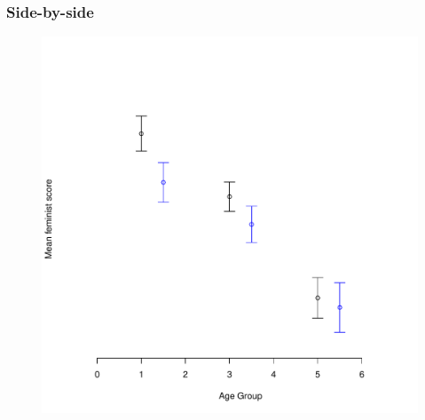 \documentclass{beamer}\usepackage[]{graphicx}\usepackage[]{color}
\begin{document}
\begin{frame}[fragile]
  \frametitle{Side-by-side}

\begin{figure}[h]
  \vspace{-20pt}
  \centering
  \includegraphics[height = 0.7\textwidth, keepaspectratio]{Figure/m8}
  \label{fig:m8}
\end{figure}
\end{frame} 
\end{document}
